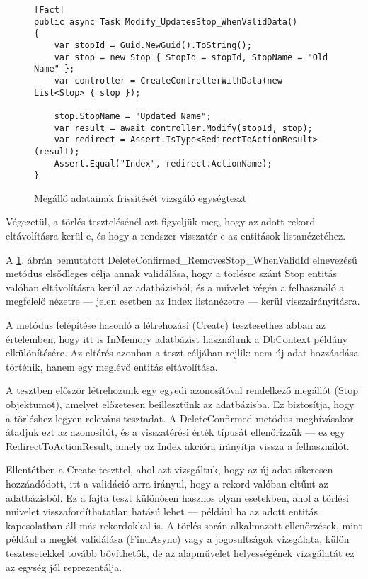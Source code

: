 \begin{figure}[H]
\caption{Megálló adatainak frissítését vizsgáló egységteszt}
\label{fig:modify-stop-test-method}
\begin{minipage}{\textwidth}
\begin{BVerbatim}
[Fact]
public async Task Modify_UpdatesStop_WhenValidData()
{
    var stopId = Guid.NewGuid().ToString();
    var stop = new Stop { StopId = stopId, StopName = "Old Name" };
    var controller = CreateControllerWithData(new List<Stop> { stop });

    stop.StopName = "Updated Name";
    var result = await controller.Modify(stopId, stop);
    var redirect = Assert.IsType<RedirectToActionResult>(result);
    Assert.Equal("Index", redirect.ActionName);
}
\end{BVerbatim}
\end{minipage}
\end{figure}

 Végezetül, a törlés tesztelésénél azt figyeljük meg, hogy az adott rekord eltávolításra kerül-e, és hogy a rendszer visszatér-e az entitások listanézetéhez.

A \ref{fig:modify-stop-test-method}. ábrán bemutatott DeleteConfirmed\_RemovesStop\_WhenValidId elnevezésű metódus elsődleges célja annak validálása, hogy a törlésre szánt Stop entitás valóban eltávolításra kerül az adatbázisból, és a művelet végén a felhasználó a megfelelő nézetre — jelen esetben az Index listanézetre — kerül visszairányításra.

A metódus felépítése hasonló a létrehozási (Create) tesztesethez abban az értelemben, hogy itt is InMemory adatbázist használunk a DbContext példány elkülönítésére. Az eltérés azonban a teszt céljában rejlik: nem új adat hozzáadása történik, hanem egy meglévő entitás eltávolítása.

A tesztben először létrehozunk egy egyedi azonosítóval rendelkező megállót (Stop objektumot), amelyet előzetesen beillesztünk az adatbázisba. Ez biztosítja, hogy a törléshez legyen releváns tesztadat. A DeleteConfirmed metódus meghívásakor átadjuk ezt az azonosítót, és a visszatérési érték típusát ellenőrizzük — ez egy RedirectToActionResult, amely az Index akcióra irányítja vissza a felhasználót.

Ellentétben a Create teszttel, ahol azt vizsgáltuk, hogy az új adat sikeresen hozzáadódott, itt a validáció arra irányul, hogy a rekord valóban eltűnt az adatbázisból. Ez a fajta teszt különösen hasznos olyan esetekben, ahol a törlési művelet  visszafordíthatatlan hatású lehet — például ha az adott entitás kapcsolatban áll más rekordokkal is. A törlés során alkalmazott ellenőrzések, mint például a meglét validálása (FindAsync) vagy a jogosultságok vizsgálata, külön tesztesetekkel tovább bővíthetők, de az alapművelet helyességének vizsgálatát ez az egység jól reprezentálja.

